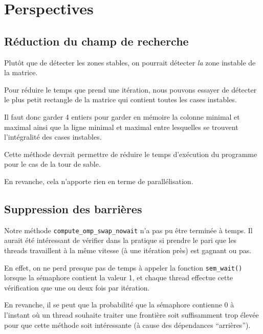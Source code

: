 \section{Perspectives}

\subsection{Réduction du champ de recherche}

Plutôt que de détecter les zones stables, on pourrait détecter
\textit{la} zone instable de la matrice.

Pour réduire le temps que prend une itération, nous pouvons essayer de
détecter le plus petit rectangle de la matrice qui contient toutes les
cases instables.

Il faut donc garder 4 entiers pour garder en mémoire la colonne
minimal et maximal ainsi que la ligne minimal et maximal entre
lesquelles se trouvent l'intégralité des cases instables.

Cette méthode devrait permettre de réduire le temps d'exécution du
programme pour le cas de la tour de sable.

En revanche, cela n'apporte rien en terme de parallélisation.

\subsection{Suppression des barrières}

Notre méthode \texttt{compute\_omp\_swap\_nowait} n'a pas pu être
terminée à temps. Il aurait été intéressant de vérifier dans la
pratique si prendre le pari que les threads travaillent à la même
vitesse (à une itération près) est gagnant ou pas.

En effet, on ne perd presque pas de temps à appeler la fonction
\texttt{sem\_wait()} lorsque la sémaphore contient la valeur 1, et
chaque thread effectue cette vérification que une ou deux fois par
itération.

En revanche, il se peut que la probabilité que la sémaphore contienne
0 à l'instant où un thread souhaite traiter une frontière soit
suffisamment trop élevée pour que cette méthode soit intéressante (à cause des dépendances ``arrières'').
